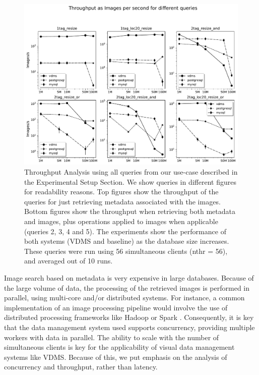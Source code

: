 \begin{figure}[ht]
\includegraphics[width=\textwidth]{figures/plot_56_mosaic_results_throughput}
\caption{Throughput Analysis using all queries from our use-case
described in the Experimental Setup Section.
We show queries in different figures for readability reasons.
Top figures show the throughput of the queries for
just retrieving metadata associated with the images.
Bottom figures show the throughput when retrieving both metadata and images,
plus operations applied to images when applicable (queries 2, 3, 4 and 5).
The experiments show the performance of both systems (VDMS and baseline) as the
database size increases.
These queries were run using 56 simultaneous clients (nthr = 56),
and averaged out of 10 runs.}
\label{fig:q_throughput_56}
\end{figure}

Image search based on metadata is very expensive in large databases.
Because of the large volume of data, the processing of the retrieved images
is performed in parallel, using multi-core and/or distributed systems.
For instance, a common implementation of an image processing pipeline
would involve the use of distributed processing frameworks
like Hadoop \cite{hadoop} or Spark \cite{spark}.
Consequently, it is key that the data management system used supports
concurrency, providing multiple workers with data in parallel.
The ability to scale with the number of simultaneous clients is key for the
applicability of visual data management systems like VDMS.
Because of this, we put emphasis on the analysis of concurrency and throughput,
rather than latency.

